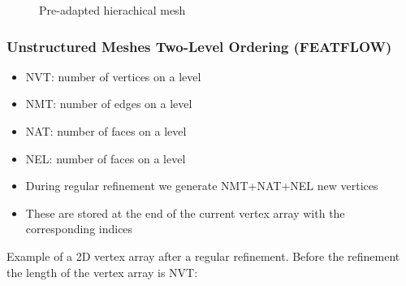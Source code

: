 \begin{frame}
\begin{figure}[h!]
\centering
{}
\hspace{1.0cm}
\caption{Pre-adapted hierachical mesh}
\label{fig:bench_setup}
\end{figure}
\end{frame}

\begin{frame}[fragile]
\frametitle{Unstructured Meshes Two-Level Ordering (FEATFLOW)}
\begin{itemize}
\item NVT: number of vertices on a level
\item NMT: number of edges on a level
\item NAT: number of faces on a level
\item NEL: number of faces on a level
\item During regular refinement we generate NMT+NAT+NEL new vertices
\item These are stored at the end of the current vertex array with the corresponding indices
\end{itemize}
Example of a 2D vertex array after a regular refinement. Before the refinement the length of the vertex array is NVT:
\end{frame}

